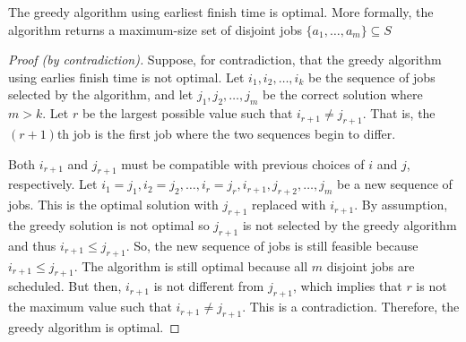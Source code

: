 \begin{theorem}
    The greedy algorithm using earliest finish time is optimal. More formally, the algorithm returns a maximum-size set of disjoint jobs $\{a_1,\ldots,a_m\} \subseteq S$
\end{theorem}

\begin{proof}[Proof (by contradiction)]
    Suppose, for contradiction, that the greedy algorithm using earlies finish time is not optimal. Let $i_1,i_2,\ldots,i_k$ be the sequence of jobs selected by the algorithm, and let $j_1,j_2,\ldots,j_m$ be the correct solution where $m>k$. Let $r$ be the largest possible value such that $i_{r+1} \neq j_{r+1}$. That is, the $(r+1)$th job is the first job where the two sequences begin to differ. 

    Both $i_{r+1}$ and $j_{r+1}$ must be compatible with previous choices of $i$ and $j$, respectively. Let $i_1=j_1,i_2=j_2,\ldots,i_r=j_r,i_{r+1},j_{r+2}, \ldots, j_m$ be a new sequence of jobs. This is the optimal solution with $j_{r+1}$ replaced with $i_{r+1}$. By assumption, the greedy solution is not optimal so $j_{r+1}$ is not selected by the greedy algorithm and thus $i_{r+1} \leq j_{r+1}$. So, the new sequence of jobs is still feasible because $i_{r+1} \leq j_{r+1}$. The algorithm is still optimal because all $m$ disjoint jobs are scheduled. But then, $i_{r+1}$ is not different from $j_{r+1}$, which implies that $r$ is not the maximum value such that $i_{r+1} \neq j_{r+1}$. This is a contradiction. Therefore, the greedy algorithm is optimal.
\end{proof}

